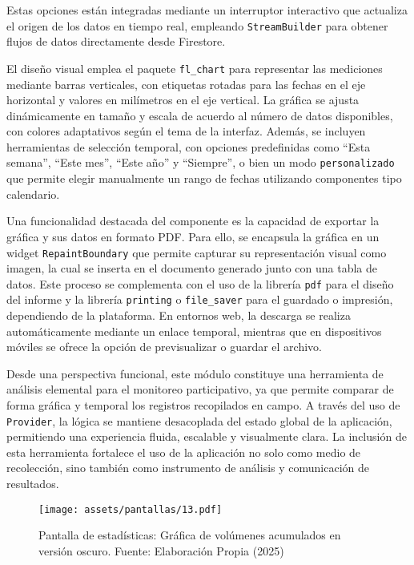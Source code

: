 Estas opciones están integradas mediante un interruptor interactivo que actualiza el origen de los datos en tiempo real, empleando \texttt{StreamBuilder} para obtener flujos de datos directamente desde Firestore.

El diseño visual emplea el paquete \texttt{fl\_chart} para representar las mediciones mediante barras verticales, con etiquetas rotadas para las fechas en el eje horizontal y valores en milímetros en el eje vertical. La gráfica se ajusta dinámicamente en tamaño y escala de acuerdo al número de datos disponibles, con colores adaptativos según el tema de la interfaz. Además, se incluyen herramientas de selección temporal, con opciones predefinidas como ``Esta semana'', ``Este mes'', ``Este año'' y ``Siempre'', o bien un modo \texttt{personalizado} que permite elegir manualmente un rango de fechas utilizando componentes tipo calendario.

Una funcionalidad destacada del componente es la capacidad de exportar la gráfica y sus datos en formato PDF. Para ello, se encapsula la gráfica en un widget \texttt{RepaintBoundary} que permite capturar su representación visual como imagen, la cual se inserta en el documento generado junto con una tabla de datos. Este proceso se complementa con el uso de la librería \texttt{pdf} para el diseño del informe y la librería \texttt{printing} o \texttt{file\_saver} para el guardado o impresión, dependiendo de la plataforma. En entornos web, la descarga se realiza automáticamente mediante un enlace temporal, mientras que en dispositivos móviles se ofrece la opción de previsualizar o guardar el archivo.

Desde una perspectiva funcional, este módulo constituye una herramienta de análisis elemental para el monitoreo participativo, ya que permite comparar de forma gráfica y temporal los registros recopilados en campo. A través del uso de \texttt{Provider}, la lógica se mantiene desacoplada del estado global de la aplicación, permitiendo una experiencia fluida, escalable y visualmente clara. La inclusión de esta herramienta fortalece el uso de la aplicación no solo como medio de recolección, sino también como instrumento de análisis y comunicación de resultados.


 


\begin{figure}[h!]
\centering
  \texttt{[image: assets/pantallas/13.pdf]}
  \caption{Pantalla de estadísticas: Gráfica de volúmenes acumulados en versión oscuro. Fuente: Elaboración Propia (2025)}
  \label{pantallas13}
\end{figure}



